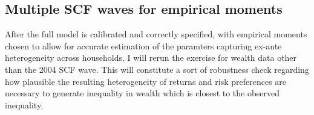 \documentclass[\econtexRoot/Chp1proposal]{subfiles}
\begin{document}
\subsection{Multiple SCF waves for empirical moments}

\par After the full model is calibrated and correctly specified, with empirical moments chosen to allow for accurate estimation of the paramters capturing ex-ante heterogeneity across households, I will rerun the exercise for wealth data other than the 2004 SCF wave. This will constitute a sort of robustness check regarding how plausible the resulting heterogeneity of returns and risk preferences are necessary to generate inequality in wealth which is closest to the observed inequality.


\onlyinsubfile{}

\end{document}
